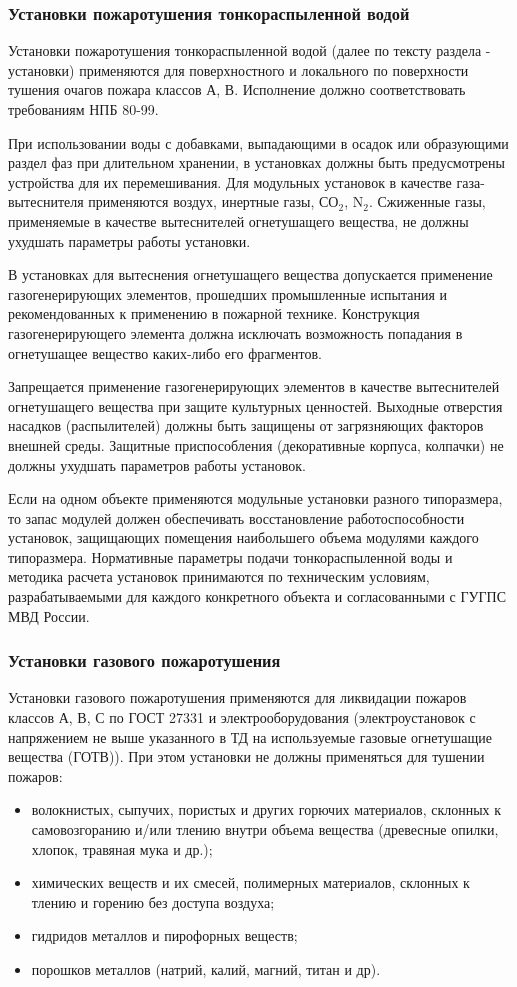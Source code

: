 \subsubsection{Установки пожаротушения тонкораспыленной водой}
Установки пожаротушения тонкораспыленной водой (далее по тексту раздела - установки) применяются для поверхностного и локального
по поверхности тушения очагов пожара классов А, В. Исполнение должно соответствовать требованиям НПБ 80-99.

При использовании воды с добавками, выпадающими в осадок или образующими раздел фаз при длительном хранении, в установках
должны быть предусмотрены устройства для их перемешивания. Для модульных установок в качестве газа-вытеснителя применяются
воздух, инертные газы, СО$_2$, N$_2$. Сжиженные газы, применяемые в качестве вытеснителей огнетушащего вещества, не должны
ухудшать параметры работы установки.

В установках для вытеснения огнетушащего вещества допускается применение газогенерирующих элементов, прошедших промышленные
испытания и рекомендованных к применению в пожарной технике. Конструкция газогенерирующего элемента должна исключать
возможность попадания в огнетушащее вещество каких-либо его фрагментов.

Запрещается применение газогенерирующих элементов в качестве вытеснителей огнетушащего вещества при защите культурных ценностей.
Выходные отверстия насадков (распылителей) должны быть защищены от загрязняющих факторов внешней среды. Защитные приспособления
(декоративные корпуса, колпачки) не должны ухудшать параметров работы установок.

Если на одном объекте применяются модульные установки разного типоразмера, то запас модулей должен обеспечивать восстановление
работоспособности установок, защищающих помещения наибольшего объема модулями каждого типоразмера. Нормативные параметры подачи
тонкораспыленной воды и методика расчета установок принимаются по техническим условиям, разрабатываемыми для каждого
конкретного объекта и согласованными с ГУГПС МВД России.

\subsubsection{Установки газового пожаротушения}
Установки газового пожаротушения применяются для ликвидации пожаров классов А, В, С по ГОСТ 27331 и электрооборудования (электроустановок с напряжением не выше указанного в ТД на используемые газовые огнетушащие вещества (ГОТВ)).
При этом установки не должны применяться для тушении пожаров:
\begin{itemize}
\item волокнистых, сыпучих, пористых и других горючих материалов, склонных к самовозгоранию и/или тлению внутри объема вещества
(древесные опилки, хлопок, травяная мука и др.);
\item химических веществ и их смесей, полимерных материалов, склонных к тлению и горению без доступа воздуха;
\item гидридов металлов и пирофорных веществ;
\item порошков металлов (натрий, калий, магний, титан и др).
\end{itemize}

